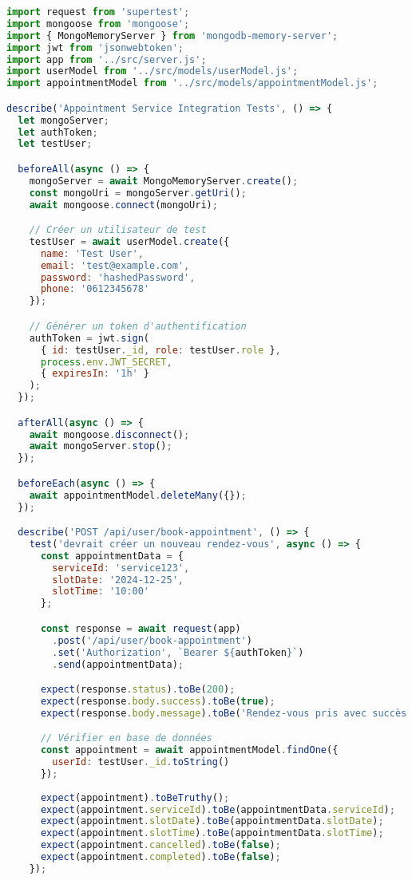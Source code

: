 \begin{lstlisting}[language=JavaScript, caption=appointmentService.integration.test.js]
import request from 'supertest';
import mongoose from 'mongoose';
import { MongoMemoryServer } from 'mongodb-memory-server';
import jwt from 'jsonwebtoken';
import app from '../src/server.js';
import userModel from '../src/models/userModel.js';
import appointmentModel from '../src/models/appointmentModel.js';

describe('Appointment Service Integration Tests', () => {
  let mongoServer;
  let authToken;
  let testUser;

  beforeAll(async () => {
    mongoServer = await MongoMemoryServer.create();
    const mongoUri = mongoServer.getUri();
    await mongoose.connect(mongoUri);

    // Créer un utilisateur de test
    testUser = await userModel.create({
      name: 'Test User',
      email: 'test@example.com',
      password: 'hashedPassword',
      phone: '0612345678'
    });

    // Générer un token d'authentification
    authToken = jwt.sign(
      { id: testUser._id, role: testUser.role },
      process.env.JWT_SECRET,
      { expiresIn: '1h' }
    );
  });

  afterAll(async () => {
    await mongoose.disconnect();
    await mongoServer.stop();
  });

  beforeEach(async () => {
    await appointmentModel.deleteMany({});
  });

  describe('POST /api/user/book-appointment', () => {
    test('devrait créer un nouveau rendez-vous', async () => {
      const appointmentData = {
        serviceId: 'service123',
        slotDate: '2024-12-25',
        slotTime: '10:00'
      };

      const response = await request(app)
        .post('/api/user/book-appointment')
        .set('Authorization', `Bearer ${authToken}`)
        .send(appointmentData);

      expect(response.status).toBe(200);
      expect(response.body.success).toBe(true);
      expect(response.body.message).toBe('Rendez-vous pris avec succès');

      // Vérifier en base de données
      const appointment = await appointmentModel.findOne({
        userId: testUser._id.toString()
      });
      
      expect(appointment).toBeTruthy();
      expect(appointment.serviceId).toBe(appointmentData.serviceId);
      expect(appointment.slotDate).toBe(appointmentData.slotDate);
      expect(appointment.slotTime).toBe(appointmentData.slotTime);
      expect(appointment.cancelled).toBe(false);
      expect(appointment.completed).toBe(false);
    });


\end{lstlisting}
